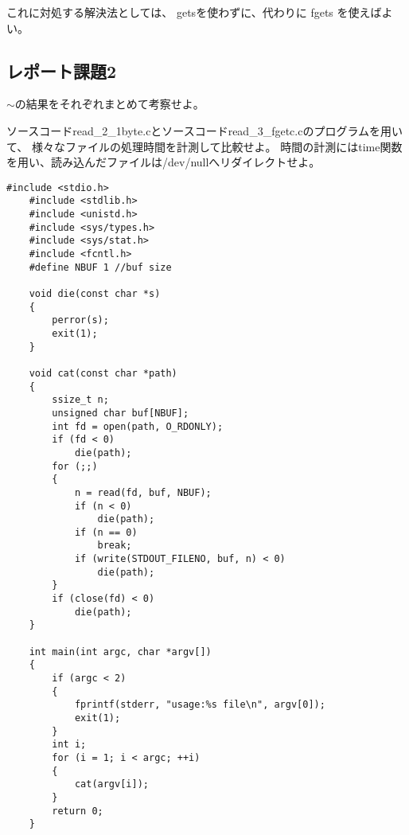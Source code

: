 \documentclass[12pt]{jarticle}
\begin{document}
これに対処する解決法としては、
getsを使わずに、代わりに fgets を使えばよい。

\subsection{レポート課題2}
\begin{shadebox}
    $\sim$の結果をそれぞれまとめて考察せよ。
\end{shadebox}

\begin{itembox}[l]{}
    ソースコードread\_2\_1byte.cとソースコードread\_3\_fgetc.cのプログラムを用いて、
    様々なファイルの処理時間を計測して比較せよ。
    時間の計測にはtime関数を用い、読み込んだファイルは/dev/nullへリダイレクトせよ。
\end{itembox}
\clearpage
\begin{lstlisting}[caption=read\_2\_1byte.c,label=read,style = lstC]
    #include <stdio.h>
    #include <stdlib.h>
    #include <unistd.h>
    #include <sys/types.h>
    #include <sys/stat.h>
    #include <fcntl.h>
    #define NBUF 1 //buf size
    
    void die(const char *s)
    {
        perror(s);
        exit(1);
    }
    
    void cat(const char *path)
    {
        ssize_t n;
        unsigned char buf[NBUF];
        int fd = open(path, O_RDONLY);
        if (fd < 0)
            die(path);
        for (;;)
        {
            n = read(fd, buf, NBUF);
            if (n < 0)
                die(path);
            if (n == 0)
                break;
            if (write(STDOUT_FILENO, buf, n) < 0)
                die(path);
        }
        if (close(fd) < 0)
            die(path);
    }
    
    int main(int argc, char *argv[])
    {
        if (argc < 2)
        {
            fprintf(stderr, "usage:%s file\n", argv[0]);
            exit(1);
        }
        int i;
        for (i = 1; i < argc; ++i)
        {
            cat(argv[i]);
        }
        return 0;
    }
\end{lstlisting}
\clearpage
\end{document}
